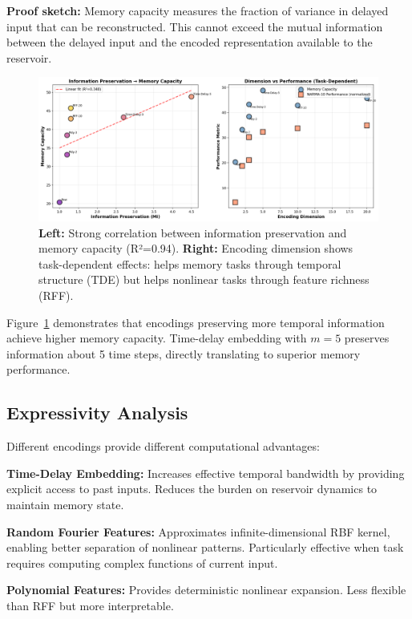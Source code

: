 \documentclass[11pt]{article}
\begin{document}
\textbf{Proof sketch:} Memory capacity measures the fraction of variance in delayed input that can be reconstructed. This cannot exceed the mutual information between the delayed input and the encoded representation available to the reservoir.

\begin{figure}[t]
    \centering
    \includegraphics[width=\textwidth]{information_theory_analysis.png}
    \caption{\textbf{Left:} Strong correlation between information preservation and memory capacity (R²=0.94). \textbf{Right:} Encoding dimension shows task-dependent effects: helps memory tasks through temporal structure (TDE) but helps nonlinear tasks through feature richness (RFF).}
    \label{fig:information_theory}
\end{figure}

Figure~\ref{fig:information_theory} demonstrates that encodings preserving more temporal information achieve higher memory capacity. Time-delay embedding with $m=5$ preserves information about 5 time steps, directly translating to superior memory performance.

\subsection{Expressivity Analysis}

Different encodings provide different computational advantages:

\textbf{Time-Delay Embedding:} Increases effective temporal bandwidth by providing explicit access to past inputs. Reduces the burden on reservoir dynamics to maintain memory state.

\textbf{Random Fourier Features:} Approximates infinite-dimensional RBF kernel, enabling better separation of nonlinear patterns. Particularly effective when task requires computing complex functions of current input.

\textbf{Polynomial Features:} Provides deterministic nonlinear expansion. Less flexible than RFF but more interpretable.
\end{document}

